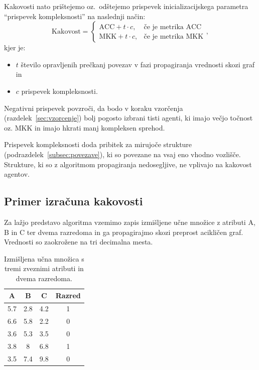 \documentclass[a4paper,12pt,openright]{book}
\begin{document}
    Kakovosti nato prištejemo oz.\ odštejemo prispevek inicializacijskega parametra \enquote{prispevek kompleksnosti} na naslednji način:
    \begin{equation}
        \text{Kakovost}=
        \begin{cases}
            \text{ACC} + t \cdot c, & \text{če je metrika ACC} \\
            \text{MKK} + t \cdot c, & \text{če je metrika MKK}
        \end{cases},
        \label{eq:prispevek_velikosti}
    \end{equation}
    kjer je:
    \begin{itemize}
        \item $t$ število opravljenih prečkanj povezav v fazi propagiranja vrednosti skozi graf in
        \item $c$ prispevek kompleksnosti.
    \end{itemize}

    Negativni prispevek povzroči, da bodo v koraku vzorčenja (razdelek~\ref{sec:vzorcenje}) bolj pogosto izbrani tisti agenti, ki imajo večjo točnost oz.
    MKK in imajo hkrati manj kompleksen sprehod.

    Prispevek kompleksnosti doda pribitek za mirujoče strukture (podrazdelek~\ref{subsec:povezave}), ki so povezane na vsaj eno vhodno vozlišče.
    Strukture, ki so z algoritmom propagiranja nedosegljive, ne vplivajo na kakovost agentov.

    \subsection{Primer izračuna kakovosti}\label{subsec:primer-izracuna-kakovosti}
    Za lažjo predstavo algoritma vzemimo zapis izmišljene učne množice z atributi A, B in C ter dvema razredoma in ga propagirajmo skozi preprost acikličen graf.
    Vrednosti so zaokrožene na tri decimalna mesta.
    \begin{table}[H]
        \centering
        \begin{tabular}{||c c c c||}
            \hline
            A & B & C & Razred \\ [0.5ex]
            \hline
            5.7 & 2.8 & 4.2 & 1 \\
            \hline
            6.6 & 5.8 & 2.2 & 0 \\
            \hline
            3.6 & 5.3 & 3.5 & 0 \\
            \hline
            3.8 & 8 & 6.8 & 1 \\
            \hline
            3.5 & 7.4 & 9.8 & 0 \\
            \hline
        \end{tabular}
        \caption{Izmišljena učna množica s tremi zveznimi atributi in dvema razredoma.}
        \label{tab:izracun_kakovosti_ucna_mnozica}
    \end{table}
\end{document}
